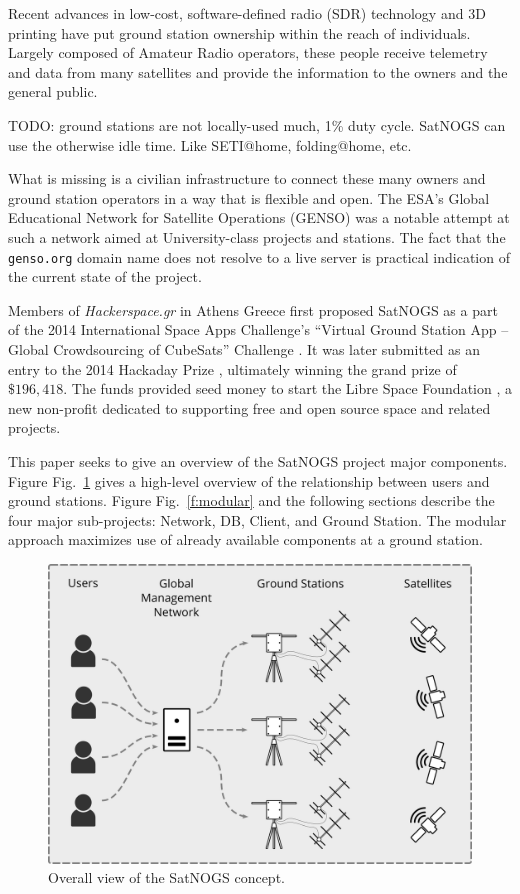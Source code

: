 \documentclass[conference,12pt]{IEEEtran}
\newcommand{\figref}[1]{Fig.~\ref{#1}}
\newlength{\figwidth}
\begin{document}
Recent advances in low-cost, software-defined radio (SDR) technology and 3D printing have put ground station ownership within the reach of individuals.
Largely composed of Amateur Radio operators, these people receive telemetry and data from many satellites and provide the information to the owners and the general public.


TODO: ground stations are not locally-used much, 1\% duty cycle.  SatNOGS can use the otherwise idle time.  Like SETI@home, folding@home, etc.

What is missing is a civilian infrastructure to connect these many owners and ground station operators in a way that is flexible and open.
The ESA's Global Educational Network for Satellite Operations (GENSO) \cite{GENSO} was a notable attempt at such a network aimed at University-class projects and stations.
The fact that the \verb|genso.org| domain name does not resolve to a live server is practical indication of the current state of the project.

Members of \emph{Hackerspace.gr} \cite{Hackerspacegr} in Athens Greece first proposed SatNOGS as a part of the 2014 International Space Apps Challenge's ``Virtual Ground Station App -- Global Crowdsourcing of CubeSats'' Challenge \cite{SpaceAppsChallenge2014-SatNOGS}.
It was later submitted as an entry to the 2014 Hackaday Prize \cite{HackadayPrize2014}, ultimately winning the grand prize of $\$196,418$.
The funds provided seed money to start the Libre Space Foundation \cite{LibreSpaceFoundation}, a new non-profit dedicated to supporting free and open source space and related projects.


This paper seeks to give an overview of the SatNOGS project major components.
Figure \figref{f:overall} gives a high-level overview of the relationship between users and ground stations.
Figure \figref{f:modular} and the following sections describe the four major sub-projects: Network, DB, Client, and Ground Station.
The modular approach maximizes use of already available components at a ground station.

\begin{figure}[htbp]
\centering
\includegraphics[width=\figwidth]{fig/overall-system}
\caption{Overall view of the SatNOGS concept.}
\label{f:overall}
\end{figure}
\end{document}
